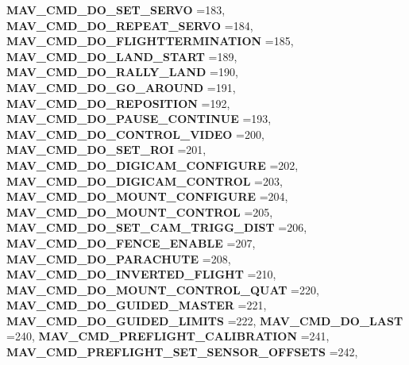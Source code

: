 \begin{DoxyCompactItemize}
\textbf{ M\+A\+V\+\_\+\+C\+M\+D\+\_\+\+D\+O\+\_\+\+S\+E\+T\+\_\+\+S\+E\+R\+VO} =183, 
\textbf{ M\+A\+V\+\_\+\+C\+M\+D\+\_\+\+D\+O\+\_\+\+R\+E\+P\+E\+A\+T\+\_\+\+S\+E\+R\+VO} =184, 
\textbf{ M\+A\+V\+\_\+\+C\+M\+D\+\_\+\+D\+O\+\_\+\+F\+L\+I\+G\+H\+T\+T\+E\+R\+M\+I\+N\+A\+T\+I\+ON} =185, 
\newline
\textbf{ M\+A\+V\+\_\+\+C\+M\+D\+\_\+\+D\+O\+\_\+\+L\+A\+N\+D\+\_\+\+S\+T\+A\+RT} =189, 
\textbf{ M\+A\+V\+\_\+\+C\+M\+D\+\_\+\+D\+O\+\_\+\+R\+A\+L\+L\+Y\+\_\+\+L\+A\+ND} =190, 
\textbf{ M\+A\+V\+\_\+\+C\+M\+D\+\_\+\+D\+O\+\_\+\+G\+O\+\_\+\+A\+R\+O\+U\+ND} =191, 
\textbf{ M\+A\+V\+\_\+\+C\+M\+D\+\_\+\+D\+O\+\_\+\+R\+E\+P\+O\+S\+I\+T\+I\+ON} =192, 
\newline
\textbf{ M\+A\+V\+\_\+\+C\+M\+D\+\_\+\+D\+O\+\_\+\+P\+A\+U\+S\+E\+\_\+\+C\+O\+N\+T\+I\+N\+UE} =193, 
\textbf{ M\+A\+V\+\_\+\+C\+M\+D\+\_\+\+D\+O\+\_\+\+C\+O\+N\+T\+R\+O\+L\+\_\+\+V\+I\+D\+EO} =200, 
\textbf{ M\+A\+V\+\_\+\+C\+M\+D\+\_\+\+D\+O\+\_\+\+S\+E\+T\+\_\+\+R\+OI} =201, 
\textbf{ M\+A\+V\+\_\+\+C\+M\+D\+\_\+\+D\+O\+\_\+\+D\+I\+G\+I\+C\+A\+M\+\_\+\+C\+O\+N\+F\+I\+G\+U\+RE} =202, 
\newline
\textbf{ M\+A\+V\+\_\+\+C\+M\+D\+\_\+\+D\+O\+\_\+\+D\+I\+G\+I\+C\+A\+M\+\_\+\+C\+O\+N\+T\+R\+OL} =203, 
\textbf{ M\+A\+V\+\_\+\+C\+M\+D\+\_\+\+D\+O\+\_\+\+M\+O\+U\+N\+T\+\_\+\+C\+O\+N\+F\+I\+G\+U\+RE} =204, 
\textbf{ M\+A\+V\+\_\+\+C\+M\+D\+\_\+\+D\+O\+\_\+\+M\+O\+U\+N\+T\+\_\+\+C\+O\+N\+T\+R\+OL} =205, 
\textbf{ M\+A\+V\+\_\+\+C\+M\+D\+\_\+\+D\+O\+\_\+\+S\+E\+T\+\_\+\+C\+A\+M\+\_\+\+T\+R\+I\+G\+G\+\_\+\+D\+I\+ST} =206, 
\newline
\textbf{ M\+A\+V\+\_\+\+C\+M\+D\+\_\+\+D\+O\+\_\+\+F\+E\+N\+C\+E\+\_\+\+E\+N\+A\+B\+LE} =207, 
\textbf{ M\+A\+V\+\_\+\+C\+M\+D\+\_\+\+D\+O\+\_\+\+P\+A\+R\+A\+C\+H\+U\+TE} =208, 
\textbf{ M\+A\+V\+\_\+\+C\+M\+D\+\_\+\+D\+O\+\_\+\+I\+N\+V\+E\+R\+T\+E\+D\+\_\+\+F\+L\+I\+G\+HT} =210, 
\textbf{ M\+A\+V\+\_\+\+C\+M\+D\+\_\+\+D\+O\+\_\+\+M\+O\+U\+N\+T\+\_\+\+C\+O\+N\+T\+R\+O\+L\+\_\+\+Q\+U\+AT} =220, 
\newline
\textbf{ M\+A\+V\+\_\+\+C\+M\+D\+\_\+\+D\+O\+\_\+\+G\+U\+I\+D\+E\+D\+\_\+\+M\+A\+S\+T\+ER} =221, 
\textbf{ M\+A\+V\+\_\+\+C\+M\+D\+\_\+\+D\+O\+\_\+\+G\+U\+I\+D\+E\+D\+\_\+\+L\+I\+M\+I\+TS} =222, 
\textbf{ M\+A\+V\+\_\+\+C\+M\+D\+\_\+\+D\+O\+\_\+\+L\+A\+ST} =240, 
\textbf{ M\+A\+V\+\_\+\+C\+M\+D\+\_\+\+P\+R\+E\+F\+L\+I\+G\+H\+T\+\_\+\+C\+A\+L\+I\+B\+R\+A\+T\+I\+ON} =241, 
\newline
\textbf{ M\+A\+V\+\_\+\+C\+M\+D\+\_\+\+P\+R\+E\+F\+L\+I\+G\+H\+T\+\_\+\+S\+E\+T\+\_\+\+S\+E\+N\+S\+O\+R\+\_\+\+O\+F\+F\+S\+E\+TS} =242, 

\end{DoxyCompactItemize}
